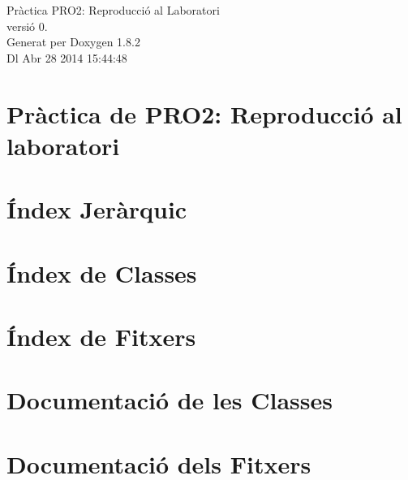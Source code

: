 \documentclass{book}
\begin{document}
\hypersetup{pageanchor=false,citecolor=blue}
\begin{titlepage}
\vspace*{7cm}
\begin{center}
{\Large Pràctica P\-R\-O2\-: Reproducció al Laboratori \\[1ex]\large versió 0. }\\
\vspace*{1cm}
{\large Generat per Doxygen 1.8.2}\\
\vspace*{0.5cm}
{\small Dl Abr 28 2014 15:44:48}\\
\end{center}
\end{titlepage}
\clearemptydoublepage
{}
\tableofcontents
\clearemptydoublepage
{}
\hypersetup{pageanchor=true,citecolor=blue}
\chapter{Pràctica de P\-R\-O2\-: Reproducció al laboratori}
\label{index}\hypertarget{index}{}
\chapter{Índex Jeràrquic}

\chapter{Índex de Classes}

\chapter{Índex de Fitxers}

\chapter{Documentació de les Classes}









\chapter{Documentació dels Fitxers}






\printindex
\end{document}
